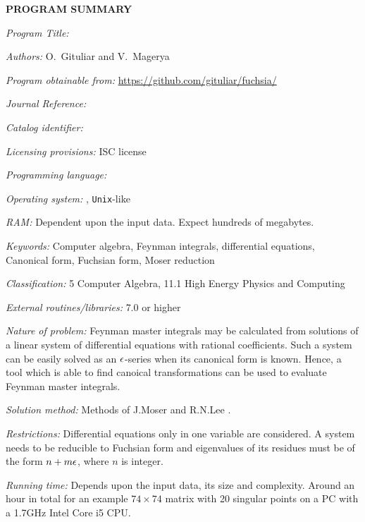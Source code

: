 {\bf PROGRAM SUMMARY}

\begin{small}
\noindent

{\em Program Title:}
    \fuchsia

{\em Authors:}
    O.~Gituliar and V.~Magerya

{\em Program obtainable from:}
    \url{https://github.com/gituliar/fuchsia/}

{\em Journal Reference:}

{\em Catalog identifier:}

{\em Licensing provisions:}
    ISC license

{\em Programming language:}

{\em Operating system:}
    \linux, \texttt{Unix}-like

{\em RAM:}
    Dependent upon the input data. Expect hundreds of megabytes.

{\em Keywords:}
    Computer algebra, Feynman integrals, differential equations, Canonical form, Fuchsian form, Moser reduction

{\em Classification:}
    5 Computer Algebra, 11.1 High Energy Physics and Computing

{\em External routines/libraries:}
    \href{http://www.sagemath.org/}{\sage} 7.0 or higher

{\em Nature of problem:}
    Feynman master integrals may be calculated from solutions of a linear system of differential equations with rational coefficients.
    Such a system can be easily solved as an $\epsilon$-series when its canonical form is known.
    Hence, a tool which is able to find canoical transformations can be used to evaluate Feynman master integrals. 

{\em Solution method:}
    Methods of J.Moser \cite{Mos59} and R.N.Lee \cite{Lee15}.

{\em Restrictions:}
    Differential equations only in one variable are considered.
    A system needs to be reducible to Fuchsian form and eigenvalues of its residues must be of the form $n + m \epsilon$, where $n$ is integer.

{\em Running time:}
    Depends upon the input data, its size and complexity.
    Around an hour in total for an example $74\times74$ matrix with 20 singular points on a PC with a 1.7GHz Intel Core i5 CPU.

\end{small}
